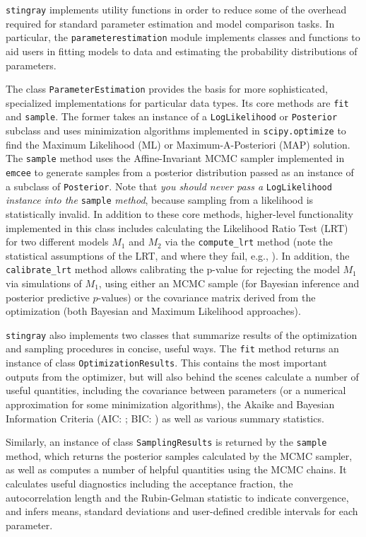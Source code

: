 \documentclass[twocolumn]{aastex62}
\newcommand{\stingray}{\texttt{stingray}\xspace}
\begin{document}
\stingray implements utility functions in order to reduce some of the overhead required for standard parameter estimation and model comparison tasks. 
In particular, the \verb|parameterestimation| module implements classes and functions to aid users in fitting models to data and estimating the probability distributions of parameters.

The class \texttt{ParameterEstimation} provides the basis for more sophisticated, specialized implementations for particular data types. 
Its core methods are \verb|fit| and \verb|sample|. 
The former takes an instance of a \verb|LogLikelihood| or \verb|Posterior| subclass and uses minimization algorithms implemented in \verb|scipy.optimize| to find the Maximum Likelihood (ML) or Maximum-A-Posteriori (MAP) solution. The \verb|sample| method uses the Affine-Invariant MCMC sampler implemented in \texttt{emcee} \citep{emcee} to generate samples from a posterior distribution passed as an instance of a subclass of \verb|Posterior|. Note that \textit{you should never pass a} \verb|LogLikelihood| \textit{instance into the} \verb|sample| \textit{method}, because sampling from a likelihood is statistically invalid. In addition to these core methods, higher-level functionality implemented in this class includes calculating the Likelihood Ratio Test (LRT) for two different models $M_1$ and $M_2$ via the \verb|compute_lrt| method (note the statistical assumptions of the LRT, and where they fail, e.g., \citealt{protassov2002}). In addition, the \verb|calibrate_lrt| method allows calibrating the p-value for rejecting the model $M_1$ via simulations of $M_1$, using either an MCMC sample (for Bayesian inference and posterior predictive $p$-values) or the covariance matrix derived from the optimization (both Bayesian and Maximum Likelihood approaches).

\stingray also implements two classes that summarize results of the optimization and sampling procedures in concise, useful ways. 
The \verb|fit| method returns an instance of class \verb|OptimizationResults|. 
This contains the most important outputs from the optimizer, but will also behind the scenes calculate a number of useful quantities, including the covariance between parameters (or a numerical approximation for some minimization algorithms), the Akaike and Bayesian Information Criteria (AIC: \citealt{akaike1974}; BIC: \citealt{schwarz1978}) as well as various summary statistics.%

Similarly, an instance of class \verb|SamplingResults| is returned by the \verb|sample| method, which returns the posterior samples calculated by the MCMC sampler, as well as computes a number of helpful quantities using the MCMC chains. It calculates useful diagnostics including the acceptance fraction, the autocorrelation length and the Rubin-Gelman statistic \citep{gelman1992} to indicate convergence, and infers means, standard deviations and user-defined credible intervals for each parameter.
\end{document}
